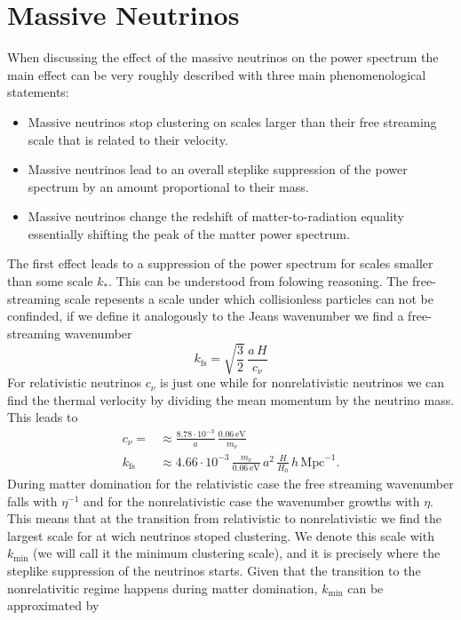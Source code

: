 \documentclass[oneside]{book}
\begin{document}
\section{Massive Neutrinos}  
When discussing the effect of the massive neutrinos on the power spectrum the main effect can be very roughly described with three main phenomenological statements:\begin{itemize}
    \item Massive neutrinos stop clustering on scales larger than their free streaming scale that is related to their velocity.
    \item Massive neutrinos lead to an overall steplike suppression of the power spectrum by an amount proportional to their mass.
    \item Massive neutrinos change the redshift of matter-to-radiation equality essentially shifting the peak of the matter power spectrum.
\end{itemize}
The first effect leads to a suppression of the power spectrum for scales smaller than some scale $k_*$. This can be understood from folowing reasoning. The free-streaming scale repesents a scale under which collisionless particles can not be confinded, if we define it analogously to the Jeans wavenumber we find a free-streaming wavenumber 
\begin{equation}
    k_\mathrm{fs} = \sqrt{\frac{3}{2}}\,\frac{a\,H}{c_\nu}
\end{equation}
For relativistic neutrinos $c_\nu$ is just one while for nonrelativistic neutrinos we can find the thermal verlocity by dividing the mean momentum by the neutrino mass. This leads to \begin{align}
    c_\nu =  &\approx \frac{8.78\cdot10^{-3}}{a}\,\frac{0.06\,\mathrm{eV}}{m_\nu} \nonumber \\
    k_\mathrm{fs} &\approx 4.66\cdot10^{-3}\,\frac{m_\nu}{0.06\,\mathrm{eV}}\,a^2\,\frac{H}{H_0}\,h\,\mathrm{Mpc}^{-1}.
\end{align}
During matter domination for the relativistic case the free streaming wavenumber falls with $\eta^{-1}$ and for the nonrelativistic case the wavenumber growths with $\eta$. This means that at the transition from relativistic to nonrelativistic we find the largest scale for at wich neutrinos stoped clustering. We denote this scale with $k_\mathrm{min}$ (we will call it the minimum clustering scale), and it is precisely where the steplike suppression of the neutrinos starts. Given that the transition to the nonrelativitic regime happens during matter domination, $k_\mathrm{min}$ can be approximated by 
\end{document}
